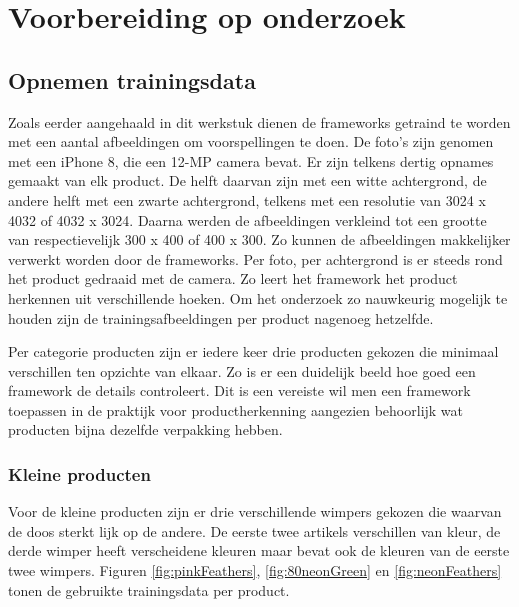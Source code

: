 
\chapter{Voorbereiding op onderzoek}
\label{ch:Voorbereiding op onderzoek}

\section{Opnemen trainingsdata}
\label{sec:Opnemen trainingsdata}

Zoals eerder aangehaald in dit werkstuk dienen de frameworks getraind te worden met een aantal afbeeldingen om voorspellingen te doen. De foto’s zijn genomen met een iPhone 8, die een 12-MP camera bevat. Er zijn telkens dertig opnames gemaakt van elk product. De helft daarvan zijn met een witte achtergrond, de andere helft met een zwarte achtergrond, telkens met een resolutie van 3024 x 4032 of 4032 x 3024. Daarna werden de afbeeldingen verkleind tot een grootte van respectievelijk 300 x 400 of 400 x 300. Zo kunnen de afbeeldingen makkelijker verwerkt worden door de frameworks. Per foto, per achtergrond is er steeds rond het product gedraaid met de camera. Zo leert het framework het product herkennen uit verschillende hoeken. Om het onderzoek zo nauwkeurig mogelijk te houden zijn de trainingsafbeeldingen per product nagenoeg hetzelfde. 

Per categorie producten zijn er iedere keer drie producten gekozen die minimaal verschillen ten opzichte van elkaar. Zo is er een duidelijk beeld hoe goed een framework de details controleert. Dit is een vereiste wil men een framework toepassen in de praktijk voor productherkenning aangezien behoorlijk wat producten bijna dezelfde verpakking hebben.

\subsection{Kleine producten}
\label{ssec:Kleine producten}

Voor de kleine producten zijn er drie verschillende wimpers gekozen die waarvan de doos sterkt lijk op de andere. De eerste twee artikels verschillen van kleur, de derde wimper heeft verscheidene kleuren maar bevat ook de kleuren van de eerste twee wimpers.
Figuren \ref{fig:pinkFeathers}, \ref{fig:80neonGreen} en \ref{fig:neonFeathers} tonen de gebruikte trainingsdata per product.

